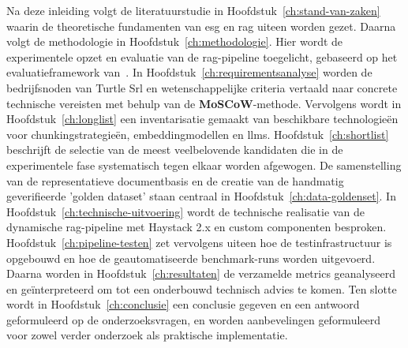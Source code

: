 Na deze inleiding volgt de literatuurstudie in Hoofdstuk~\ref{ch:stand-van-zaken} waarin de theoretische fundamenten van \gls{esg} en \gls{rag} uiteen worden gezet. Daarna volgt de methodologie in Hoofdstuk~\ref{ch:methodologie}. Hier wordt de experimentele opzet en evaluatie van de \gls{rag}-pipeline toegelicht, gebaseerd op het evaluatieframework van~\autocite{Es2024}. In Hoofdstuk~\ref{ch:requirementsanalyse} worden de bedrijfsnoden van Turtle Srl en wetenschappelijke criteria vertaald naar concrete technische vereisten met behulp van de \textbf{MoSCoW}-methode. Vervolgens wordt in Hoofdstuk~\ref{ch:longlist} een inventarisatie gemaakt van beschikbare technologieën voor chunkingstrategieën, embeddingmodellen en \glspl{llm}. Hoofdstuk~\ref{ch:shortlist} beschrijft de selectie van de meest veelbelovende kandidaten die in de experimentele fase systematisch tegen elkaar worden afgewogen. De samenstelling van de representatieve documentbasis en de creatie van de handmatig geverifieerde 'golden dataset' staan centraal in Hoofdstuk~\ref{ch:data-goldenset}. In Hoofdstuk~\ref{ch:technische-uitvoering} wordt de technische realisatie van de dynamische \gls{rag}-pipeline met Haystack 2.x en custom componenten besproken. Hoofdstuk~\ref{ch:pipeline-testen} zet vervolgens uiteen hoe de testinfrastructuur is opgebouwd en hoe de geautomatiseerde benchmark-runs worden uitgevoerd. Daarna worden in Hoofdstuk~\ref{ch:resultaten} de verzamelde metrics geanalyseerd en geïnterpreteerd om tot een onderbouwd technisch advies te komen. Ten slotte wordt in Hoofdstuk~\ref{ch:conclusie} een conclusie gegeven en een antwoord geformuleerd op de onderzoeksvragen, en worden aanbevelingen geformuleerd voor zowel verder onderzoek als praktische implementatie. 